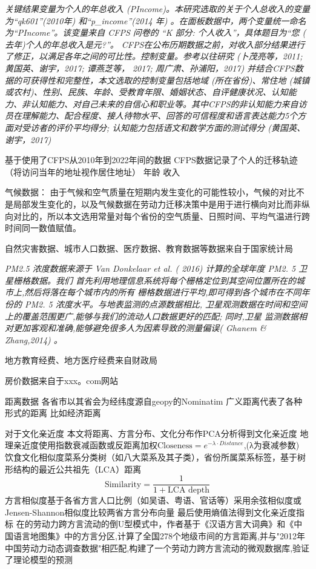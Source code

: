 \documentclass[a4paper,12pt,oneside]{book} %
\begin{document}
\textit{关键结果变量为个人的年总收入 (PIncome)。本研究选取的关于个人总收入的变量为“qk601”(2010年) 和“p\_income”(2014 年) 。在面板数据中，两个变量统一命名为“PIncome”。该变量来自 CFPS 问卷的 “K 部分: 个人收入”，具体题目为“您 ( 去年)个人的年总收入是元?”。
CFPS在公布历期数据之前，对收入部分结果进行了修正，以满足各年之间的可比性。控制变量。参考以往研究 (卜茂亮等，2011; 黄国英、谢宇，2017; 谭燕芝等， 2017; 周广肃、孙浦阳，2017) 并结合CFPS数据的可获得性和完整性，本文选取的控制变量包括地域 (所在省份)、常住地 (城镇或农村)、性别、民族、年龄、受教育年限、婚姻状态、自评健康状况、认知能力、非认知能力、对自己未来的自信心和职业等。其中CFPS的非认知能力来自访员在理解能力、配合程度、接人待物水平、回答的可信程度和语言表达能力5个方面对受访者的评价平均得分; 认知能力包括语文和数学方面的测试得分 (黄国英、谢宇，2017)}


基于使用了CFPS从2010年到2022年间的数据
CFPS数据记录了个人的迁移轨迹（将访问当年的地址视作居住地址）
年龄
收入

气候数据：
由于气候和空气质量在短期内发生变化的可能性较小，气候的对比不是局部发生变化的，以及气候数据在劳动力迁移决策中是用于进行横向对比而非纵向对比的，所以本文选用常量对每个省份的空气质量、日照时间、平均气温进行跨时间同一数值赋值。



自然灾害数据、城市人口数据、医疗数据、教育数据等数据来自于国家统计局

\textit{PM2.5 浓度数据来源于 Van Donkelaar et al. ( 2016) 计算的全球年度 PM2. 5 卫星栅格数据。我们 首先利用地理信息系统将每个栅格定位到其空间位置所在的城市上,然后将落在每个城市内的所有 栅格数据进行平均,即可得到各个城市在不同年份的 PM2. 5 浓度水平。与地表监测的点源数据相比, 卫星观测数据在时间和空间上的覆盖范围更广,能够与我们的流动人口数据更好的匹配; 同时,卫星 监测数据相对更加客观和准确,能够避免很多人为因素导致的测量偏误( Ghanem \& Zhang,2014) 。}


地方教育经费、地方医疗经费来自财政局

房价数据来自于xxx。com网站

距离数据
各省市以其省会为经纬度源自geopy的Nominatim
广义距离代表了各种形式的距离 比如经济距离

对于文化亲近度
本文将距离、方言分布、文化分布作PCA分析得到文化亲近度
地理亲近度使用指数衰减函数或反距离加权$\text{Closeness}=e^ {-\lambda \cdot Distance}$,(λ为衰减参数)
饮食文化相似度菜系分类树（如八大菜系及其子类），省份所属菜系标签，基于树形结构的最近公共祖先（LCA）距离
\begin{equation}
  \text{Similarity}=\frac{1}{1+\text{LCA depth}}
\end{equation}
方言相似度基于各省方言人口比例（如吴语、粤语、官话等）采用余弦相似度或Jensen-Shannon相似度比较两省方言分布向量
最后使用熵值法得到文化亲近度指标
在\cite{LiuYuYunLaoDongLiKuaFangYanLiuDongDeDaoUXingMoShi2015}的劳动力跨方言流动的倒U型模式中，作者基于《汉语方言大词典》和《中国语言地图集》中的方言分区,计算了全国278个地级市间的方言距离,并与"2012年中国劳动力动态调查数据"相匹配,构建了一个劳动力跨方言流动的微观数据库,验证了理论模型的预测
\end{document}
